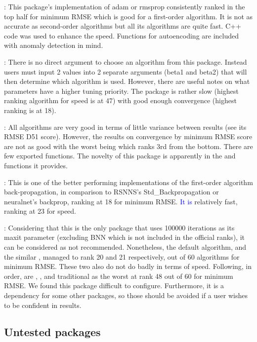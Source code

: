  \citep{R-ANN2}: This package's implementation of adam or
rmsprop consistently ranked in the top half for minimum RMSE which is
good for a first-order algorithm. It is not as accurate as second-order
algorithms but all its algorithms are quite fast. C++ code was used to
enhance the speed. Functions for autoencoding are included with anomaly
detection in mind.

 \citep{R-automl}: There is no direct argument to choose
an algorithm from this package. Instead users must input 2 values into 2
separate arguments (beta1 and beta2) that will then determine which
algorithm is used. However, there are useful notes on what parameters
have a higher tuning priority. The package is rather slow (highest
ranking algorithm for speed is  at 47) with good enough
convergence (highest ranking is  at 18).

 \citep{R-deepdive}: All algorithms are very good in terms
of little variance between results (see its RMSE D51 score). However,
the results on convergence by minimum RMSE score are not as good with
the worst being  which ranks 3rd from the bottom.
There are few exported functions. The novelty of this package is
apparently in the  and  functions it
provides.

 \citep{R-deepnet}: This is one of the better
performing implementations of the first-order algorithm
back-propagation, in comparison to RSNNS's Std\_Backpropagation or
neuralnet's backprop, ranking at 18 for minimum RMSE.
\textcolor{blue}{It is} relatively fast, ranking at 23 for speed.

 \citep{R-neuralnet}: Considering that this is the
only package that uses 100000 iterations as its maxit parameter
(excluding BNN which is not included in the official ranks), it can be
considered as not recommended. Nonetheless, the default algorithm,
 and the similar , managed to rank 20 and 21
respectively, out of 60 algorithms for minimum RMSE. These two also do
not do badly in terms of speed. Following, in order, are ,
, and traditional  as the worst at rank 48 out
of 60 for minimum RMSE. We found this package difficult to configure.
Furthermore, it is a dependency for some other packages, so those should
be avoided if a user wishes to be confident in results.

\hypertarget{untested-packages}{%
\subsection{Untested packages}\label{untested-packages}}


